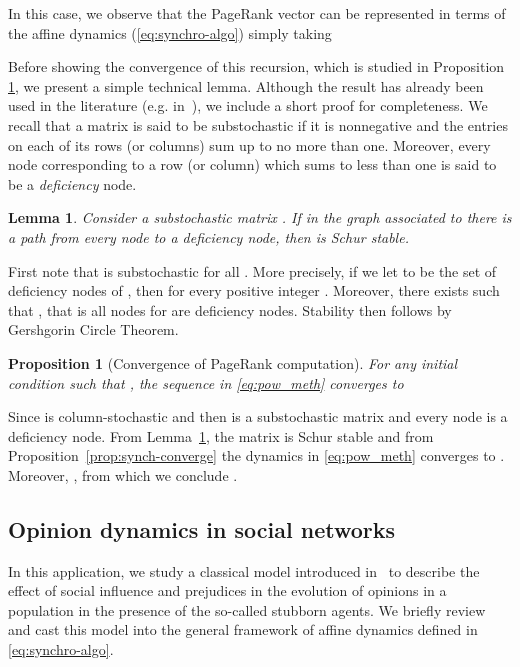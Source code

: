 \documentclass{IEEEtran}
\newtheorem{lemma}{Lemma}
\newtheorem{proposition}{Proposition}
\newcommand{\1}{\mathbf{1}} \newcommand{\ind}{\mathds{1}}
\begin{document}
In this case, we observe that the PageRank vector can be represented in terms of the affine dynamics (\ref{eq:synchro-algo})
simply taking 


Before showing the convergence of this recursion, which is studied in Proposition \ref{prop:convPR}, we present a simple technical lemma. 
Although the result has already been used in the literature (e.g. in~\cite{DA-GC-FF-AO:11}), we include a short proof for completeness. 
We recall that a matrix is said to be substochastic if it is nonnegative and the entries on each of its rows (or columns) sum up to no more than one. Moreover, every node corresponding to a row (or column) which sums to less than one is said to be a {\em deficiency} node. 

\begin{lemma}\label{lemma:substoch_stab}
Consider a  substochastic matrix . If in the graph associated to  there is a path from every node to a deficiency node, then  is Schur stable.
\end{lemma}

\begin{IEEEproof}
First note that   is substochastic for all .  More precisely,  if we let  to be the set of deficiency nodes of ,  then  for every positive integer . Moreover, there exists  such that 
, that is all nodes for  are deficiency nodes.
Stability then follows by Gershgorin Circle Theorem.
\end{IEEEproof}

\begin{proposition}[Convergence of PageRank computation]\label{prop:convPR}
For any initial condition  such that , the sequence in \eqref{eq:pow_meth} converges to

\end{proposition}

\begin{IEEEproof}
Since  is column-stochastic and  then  is a substochastic matrix and every node is a deficiency node. From Lemma~\ref{lemma:substoch_stab}, the matrix  is Schur stable and from Proposition~\ref{prop:synch-converge} the dynamics in \eqref{eq:pow_meth} converges to .
Moreover, , from which we conclude .
\end{IEEEproof}

\subsection{Opinion dynamics in social networks}
In this application, we study a classical model introduced in~\cite{NEF-ECJ:99} to describe the effect of social influence and prejudices in the evolution of opinions in a population in the presence of the so-called stubborn agents. We briefly review and cast this model into the general framework of affine dynamics defined in \eqref{eq:synchro-algo}.
\end{document}
